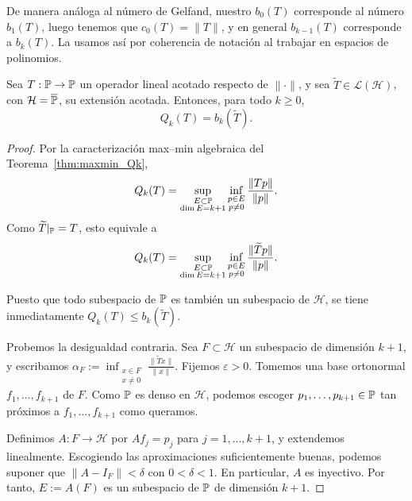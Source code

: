\begin{rmk}
	De manera análoga al número de Gelfand, nuestro $b_0(T)$ corresponde al número $b_1(T)$, luego tenemos que  $c_0(T)=\|T\|$, y en general $b_{k-1}(T)$ corresponde a $b_k(T)$. La usamos así por coherencia de notación al trabajar en espacios de polinomios.
\end{rmk}

\begin{prop}\label{prop:Qk_Bernstein}
	Sea $T:\mathbb{P}\to\mathbb{P}$ un operador lineal acotado respecto de $\|\cdot\|$, y sea $\widetilde T\in\mathcal L(\mathcal H)$, con $\mathcal H=\overline{\mathbb{P}}$, su extensión acotada. Entonces, para todo $k\ge0$,
	\[
		Q_k(T)=b_k(\widetilde T).
	\]
\end{prop}

\begin{proof}
	Por la caracterización max--min algebraica del Teorema~\ref{thm:maxmin_Qk},
	\[
		Q_k(T)
		=
		\sup_{\substack{E\subset\mathbb{P}\\ \dim E=k+1}}
		\inf_{\substack{p\in E\\ p\ne0}}
		\frac{\|Tp\|}{\|p\|}.
	\]
	Como $\widetilde T|_{\mathbb{P}}=T$, esto equivale a
	\[
		Q_k(T)
		=
		\sup_{\substack{E\subset\mathbb{P}\\ \dim E=k+1}}
		\inf_{\substack{p\in E\\ p\ne0}}
		\frac{\|\widetilde T p\|}{\|p\|}.
	\]

	Puesto que todo subespacio de $\mathbb{P}$ es también un subespacio de $\mathcal H$, se tiene inmediatamente \(Q_k(T)\le b_k(\widetilde T)\).

	Probemos la desigualdad contraria. Sea $F\subset\mathcal H$ un subespacio de dimensión $k+1$, y escribamos
	\(
	\alpha_F:=
	\inf_{\substack{x\in F\\ x\ne0}}
	\frac{\|\widetilde T x\|}{\|x\|}.
	\)
	Fijemos $\varepsilon>0$. Tomemos una base ortonormal \(f_1,\dots,f_{k+1}\) de $F$. Como $\mathbb{P}$ es denso en $\mathcal H$, podemos escoger \(p_1,\dots,p_{k+1}\in\mathbb{P}\) tan próximos a $f_1,\dots,f_{k+1}$ como queramos.

	Definimos $A:F\to\mathcal H$ por \(Af_j=p_j\) para $j=1,\dots,k+1$, y extendemos linealmente. Escogiendo las aproximaciones suficientemente buenas, podemos suponer que \(\|A-I_F\|<\delta\) con $0<\delta<1$. En particular, $A$ es inyectivo. Por tanto, \(E:=A(F)\) es un subespacio de $\mathbb{P}$ de dimensión $k+1$.


\end{proof}
